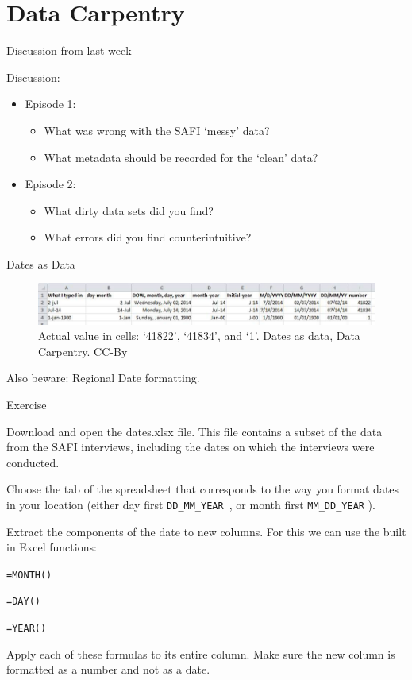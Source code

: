 \documentclass[aspectratio=1610, 11pt]{beamer} %
\begin{document}
\section{Data Carpentry}
\begin{frame}{Discussion from last week}

Discussion:

\begin{itemize}
\item Episode 1:
\begin{itemize}
\item What was wrong with the SAFI `messy' data?
\item What metadata should be recorded for the `clean' data?
\end{itemize}
\item Episode 2:
\begin{itemize}
\item What dirty data sets did you find?
\item What errors did you find counterintuitive?
\end{itemize}
\end{itemize}



\end{frame}
\begin{frame}{Dates as Data}

\begin{figure}[H]
        \centering
        \includegraphics[width=\textwidth]{figures/excel_dates_1.jpg}
        \caption{Actual value in cells: `41822', `41834', and `1'. Dates as data, Data Carpentry. CC-By}
        \label{fig:bigdates}
    \end{figure}

Also beware: Regional Date formatting.


\end{frame}
\begin{frame}{Exercise}

Download and open the dates.xlsx file. This file contains a subset of the data from the SAFI interviews, including the dates on which the interviews were conducted.

Choose the tab of the spreadsheet that corresponds to the way you format dates in your location (either day first {\tt DD\_MM\_YEAR }, or month first {\tt MM\_DD\_YEAR} ).

Extract the components of the date to new columns. For this we can use the built in Excel functions:

{\tt =MONTH()} 

{\tt =DAY()}

{\tt =YEAR()}

Apply each of these formulas to its entire column. Make sure the new column is formatted as a number and not as a date.

\end{frame}
\end{document}
